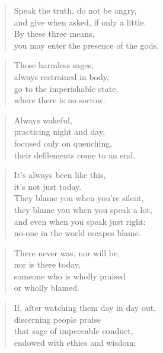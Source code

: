 \documentclass[12pt,openany]{book}%
\begin{document}
\begin{verse}%
Speak the truth, do not be angry, \\
and give when asked, if only a little. \\
By these three means, \\
you may enter the presence of the gods. 

%
\end{verse}

\begin{verse}%
Those harmless sages, \\
always restrained in body, \\
go to the imperishable state, \\
where there is no sorrow. 

%
\end{verse}

\begin{verse}%
Always wakeful, \\
practicing night and day, \\
focused only on quenching, \\
their defilements come to an end. 

%
\end{verse}

\begin{verse}%
It’s always been like this, \\
it’s not just today. \\
They blame you when you’re silent, \\
they blame you when you speak a lot, \\
and even when you speak just right: \\
no-one in the world escapes blame. 

%
\end{verse}

\begin{verse}%
There never was, nor will be, \\
nor is there today, \\
someone who is wholly praised \\
or wholly blamed. 

%
\end{verse}

\begin{verse}%
If, after watching them day in day out, \\
discerning people praise \\
that sage of impeccable conduct, \\
endowed with ethics and wisdom; 

%
\end{verse}
\end{document}
